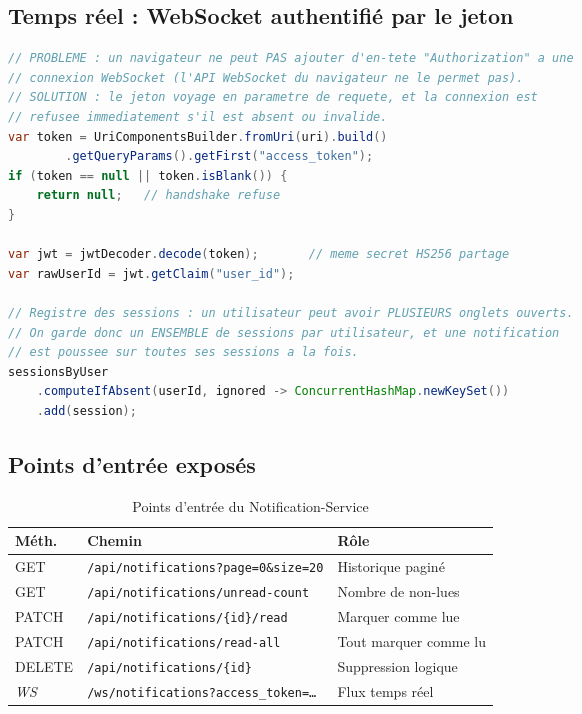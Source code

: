 \documentclass[11pt,a4paper,oneside]{report}
\newcommand{\code}[1]{\texttt{\small #1}}
\begin{document}
\subsection{Temps réel : WebSocket authentifié par le jeton}

\begin{lstlisting}[language=Java, caption={\code{NotificationWebSocketHandler.java} — authentification d'une socket}]
// PROBLEME : un navigateur ne peut PAS ajouter d'en-tete "Authorization" a une
// connexion WebSocket (l'API WebSocket du navigateur ne le permet pas).
// SOLUTION : le jeton voyage en parametre de requete, et la connexion est
// refusee immediatement s'il est absent ou invalide.
var token = UriComponentsBuilder.fromUri(uri).build()
        .getQueryParams().getFirst("access_token");
if (token == null || token.isBlank()) {
    return null;   // handshake refuse
}

var jwt = jwtDecoder.decode(token);       // meme secret HS256 partage
var rawUserId = jwt.getClaim("user_id");

// Registre des sessions : un utilisateur peut avoir PLUSIEURS onglets ouverts.
// On garde donc un ENSEMBLE de sessions par utilisateur, et une notification
// est poussee sur toutes ses sessions a la fois.
sessionsByUser
    .computeIfAbsent(userId, ignored -> ConcurrentHashMap.newKeySet())
    .add(session);
\end{lstlisting}

\subsection{Points d'entrée exposés}

\begin{table}[H]
\centering
\small
\begin{tabularx}{\linewidth}{@{}p{1.5cm}p{6.4cm}X@{}}
\toprule
\textbf{Méth.} & \textbf{Chemin} & \textbf{Rôle} \\
\midrule
GET & \code{/api/notifications?page=0\&size=20} & Historique paginé \\
GET & \code{/api/notifications/unread-count} & Nombre de non-lues \\
PATCH & \code{/api/notifications/\{id\}/read} & Marquer comme lue \\
PATCH & \code{/api/notifications/read-all} & Tout marquer comme lu \\
DELETE & \code{/api/notifications/\{id\}} & Suppression logique \\
\emph{WS} & \code{/ws/notifications?access\_token=…} & Flux temps réel \\
\bottomrule
\end{tabularx}
\caption{Points d'entrée du Notification-Service}
\end{table}
\end{document}
